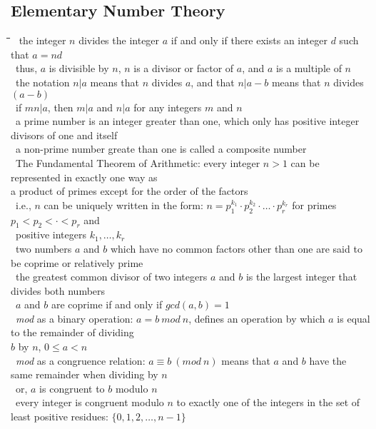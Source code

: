 \documentclass[10pt,letterpaper]{scrartcl}
\newcommand{\tbul}{\textbullet}
\newcommand{\tend}{\>\textendash}
\newcommand{\tabDef}{\hspace{2em}\=\hspace{2em}\=\hspace{2em}\=\hspace{2em}\=\kill}
\begin{document}
\subsection{Elementary Number Theory}\begin{tabbing}\tabDef
\tbul\ the integer $n$ divides the integer $a$ if and only if there exists an integer $d$ such that $a=nd$ \\
    \tend\ thus, $a$ is divisible by $n$, $n$ is a divisor or factor of $a$, and $a$ is a multiple of $n$ \\
    \tend\ the notation $n|a$ means that $n$ divides $a$, and that $n|a-b$ means that $n$ divides $(a-b)$ \\
\tbul\ if $mn|a$, then $m|a$ and $n|a$ for any integers $m$ and $n$ \\
\tbul\ a prime number is an integer greater than one, which only has positive integer divisors of one and itself \\
    \tend\ a non-prime number greate than one is called a composite number \\
\tbul\ The Fundamental Theorem of Arithmetic: every integer $n>1$ can be represented in exactly one way as \\ a product of primes except for the order of the factors \\
    \tend\ i.e., $n$ can be uniquely written in the form: $n=p_1^{k_1}\cdot p_2^{k_2}\cdot\ldots\cdot p_r^{k_r}$ for primes $p_1 < p_2 < \cdot < p_r$ and \\ \>\ positive integers $k_1,\ldots ,k_r$ \\
\tbul\ two numbers $a$ and $b$ which have no common factors other than one are said to be coprime or relatively prime \\
\tbul\ the greatest common divisor of two integers $a$ and $b$ is the largest integer that divides both numbers \\
\tbul\ $a$ and $b$ are coprime if and only if $gcd(a,b)=1$\\
\tbul\ \textit{mod} as a binary operation: $a = b\ mod \ n $, defines an operation by which $a$ is equal to the remainder of dividing \\ $b$ by $n$, $0\leq a < n$ \\
\tbul\ \textit{mod} as a congruence relation: $a \equiv b\ (mod\ n)$ means that $a$ and $b$ have the same remainder when dividing by $n$ \\
    \tend\ or, $a$ is congruent to $b$ modulo $n$ \\
\tbul\ every integer is congruent modulo $n$ to exactly one of the integers in the set of least positive residues: $\{0,1,2,\ldots , n-1\}$ \\

\end{tabbing}
\end{document}
